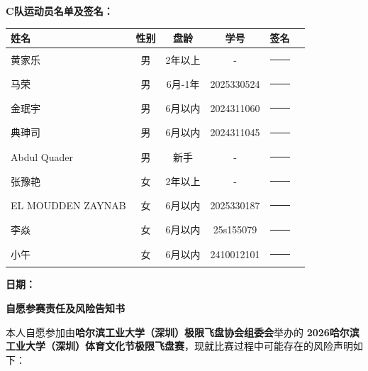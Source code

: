 \documentclass{article}
\begin{document}
\noindent \textbf{C队运动员名单及签名：} \\
\begin{center}
\small %
\renewcommand{\arraystretch}{1.5} %
\begin{tabular}{lccccl}
    \toprule
    \textbf{姓名} & \textbf{性别} & \textbf{盘龄} & \textbf{学号} & \textbf{签名} \\[3pt] %
    \midrule
    黄家乐 & 男 & 2年以上 & - & \rule{3cm}{0.4pt} \\
    马荣 & 男 & 6月-1年 & 2025330524 & \rule{3cm}{0.4pt} \\
    金珉宇 & 男 & 6月以内 & 2024311060 & \rule{3cm}{0.4pt} \\
    典珅司 & 男 & 6月以内 & 2024311045 & \rule{3cm}{0.4pt} \\
    Abdul Quader & 男 & 新手 & - & \rule{3cm}{0.4pt} \\
    张豫艳 & 女 & 2年以上 & - & \rule{3cm}{0.4pt} \\
    EL MOUDDEN ZAYNAB & 女 & 6月以内 & 2025330187 & \rule{3cm}{0.4pt} \\
    李焱 & 女 & 6月以内 & 25s155079 & \rule{3cm}{0.4pt} \\
    小午 & 女 & 6月以内 & 2410012101 & \rule{3cm}{0.4pt} \\
    \bottomrule
\end{tabular}
\end{center}

\vspace{0.5cm} %
\noindent \textbf{日期：}
\newpage

\begin{center}
    \vspace*{0cm} %
    {\fontsize{18pt}{28pt}\selectfont\textbf{自愿参赛责任及风险告知书}} %
    \vspace{0.5cm} %
\end{center}

本人自愿参加由\textbf{哈尔滨工业大学（深圳）极限飞盘协会组委会}举办的 \textbf{2026哈尔滨工业大学（深圳）体育文化节极限飞盘赛}，现就比赛过程中可能存在的风险声明如下：
\end{document}
